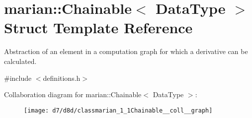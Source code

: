 \hypertarget{classmarian_1_1Chainable}{}\section{marian\+:\+:Chainable$<$ Data\+Type $>$ Struct Template Reference}
\label{classmarian_1_1Chainable}


Abstraction of an element in a computation graph for which a derivative can be calculated.  




{\ttfamily \#include $<$definitions.\+h$>$}



Collaboration diagram for marian\+:\+:Chainable$<$ Data\+Type $>$\+:
\nopagebreak
\begin{figure}[H]
\begin{center}
\leavevmode
\texttt{[image: d7/d8d/classmarian\_1\_1Chainable\_\_coll\_\_graph]}
\end{center}
\end{figure}
